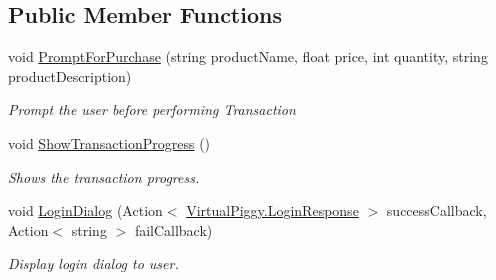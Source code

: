 \subsection*{Public Member Functions}
\begin{DoxyCompactItemize}
\item 
void \hyperlink{class_virtual_piggy_g_u_i_a0c3dfdd1f04f8c54aae45eb6e9dacbb6}{Prompt\-For\-Purchase} (string product\-Name, float price, int quantity, string product\-Description)
\begin{DoxyCompactList}\small\item\em Prompt the user before performing Transaction \end{DoxyCompactList}\item 
void \hyperlink{class_virtual_piggy_g_u_i_a8120fba4e910a063603d0acccc4d618d}{Show\-Transaction\-Progress} ()
\begin{DoxyCompactList}\small\item\em Shows the transaction progress. \end{DoxyCompactList}\item 
void \hyperlink{class_virtual_piggy_g_u_i_ae0fe2ccfef48ccfbcfa3861418081046}{Login\-Dialog} (Action$<$ \hyperlink{class_virtual_piggy_1_1_login_response}{Virtual\-Piggy.\-Login\-Response} $>$ success\-Callback, Action$<$ string $>$ fail\-Callback)
\begin{DoxyCompactList}\small\item\em Display login dialog to user. \end{DoxyCompactList}\end{DoxyCompactItemize}
